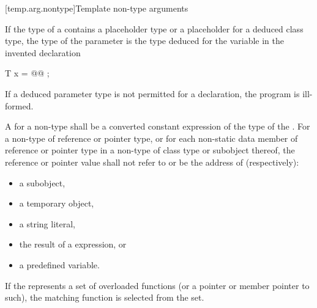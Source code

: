 [temp.arg.nontype]{Template non-type arguments}

\pnum
If the type  of a 
contains a placeholder type
or a placeholder for a deduced class type,
the type of the parameter is the type deduced
for the variable  in the invented declaration
\begin{codeblock}
  T x = @@ ;
\end{codeblock}
If a deduced parameter type is not permitted
for a  declaration,
the program is ill-formed.

\pnum
A 
for a non-type 
shall be a converted constant expression
of the type of the .
For a non-type  of reference or pointer type,
or for each non-static data member of reference or pointer type
in a non-type  of class type or subobject thereof,
the reference or pointer value shall not refer to
or be the address of (respectively):

\begin{itemize}
\item a subobject,
\item a temporary object,
\item a string literal,
\item the result of a  expression, or
\item a predefined  variable.
\end{itemize}

\begin{note}
If the 
represents a set of overloaded functions
(or a pointer or member pointer to such),
the matching function is selected from the set.
\end{note}

